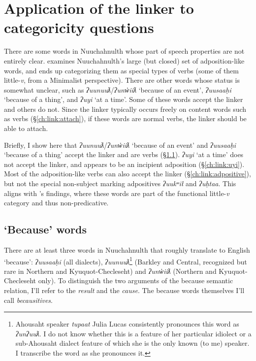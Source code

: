 \section{Application of the linker to categoricity questions} \label{ch:link:application}

There are some words in Nuuchahnulth whose part of speech properties are not entirely clear. \citet{woo2007b} examines Nuuchahnulth's large (but closed) set of adposition-like words, and ends up categorizing them as special types of verbs (some of them little-\textit{v}, from a Minimalist perspective). There are other words whose status is somewhat unclear, such as \textit{ʔuunuuƛ}/\textit{ʔunw̓iiƛ} `because of an event', \textit{ʔuusaaḥi} `because of a thing', and \textit{ʔuyi} `at a time'. Some of these words accept the linker and others do not. Since the linker typically occurs freely on content words such as verbs (\S\ref{ch:link:attach}), if these words are normal verbs, the linker should be able to attach.

Briefly, I show here that \textit{ʔuunuuƛ}/\textit{ʔunw̓iiƛ} `because of an event' and \textit{ʔuusaaḥi} `because of a thing' accept the linker and are verbs (\S\ref{ch:link:because}). \textit{ʔuyi} `at a time' does not accept the linker, and appears to be an incipient adposition (\S\ref{ch:link:uyi}). Most of the adposition-like verbs can also accept the linker (\S\ref{ch:link:adpositive}), but not the special non-subject marking adpositives \textit{ʔuukʷił} and \textit{ʔuḥtaa}. This aligns with \citeauthor{woo2007b}'s findings, where these words are part of the functional little-\textit{v} category and thus non-predicative.


\subsection{`Because' words} \label{ch:link:because}

There are at least three words in Nuuchahnulth that roughly translate to English `because': \textit{ʔuusaaḥi} (all dialects), \textit{ʔuunuuƛ}\footnote{Ahousaht speaker \textit{tupaat} Julia Lucas consistently pronounces this word as \textit{ʔunʔuuƛ}. I do not know whether this is a feature of her particular idiolect or a sub-Ahousaht dialect feature of which she is the only known (to me) speaker. I transcribe the word as she pronounces it.} (Barkley and Central, recognized but rare in Northern and Kyuquot-Checleseht) and \textit{ʔunw̓iiƛ} (Northern and Kyuquot-Checleseht only). To distinguish the two arguments of the because semantic relation, I'll refer to the \textit{result} and the \textit{cause}. The because words themselves I'll call \textit{becausitives}.

